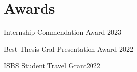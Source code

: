 \documentclass[../main.tex]{subfiles}
\begin{document}
\section{Awards}
  \vspace{2pt}
  \resumeSubHeadingListStart
    \layoutAwards
    {{Internship Commendation Award }\href{https://drive.google.com/file/d/1-Zf9n5C39MHMhlUNPOGi2Gz_DRpPg0iC/view?usp=sharing}{\faFilePdfO}}{2023}
    {}
    
    \layoutAwards
    {{Best Thesis Oral Presentation Award }\href{https://drive.google.com/file/d/1mcvcseOSgvzBLQg3tZVkGyIOOxVw6gKw/view?usp=sharing}{\faFilePdfO}}{2022}
    {}

    \layoutAwards
    {ISBS Student Travel Grant}{2022}
    {}

  \resumeSubHeadingListEnd
\end{document}
